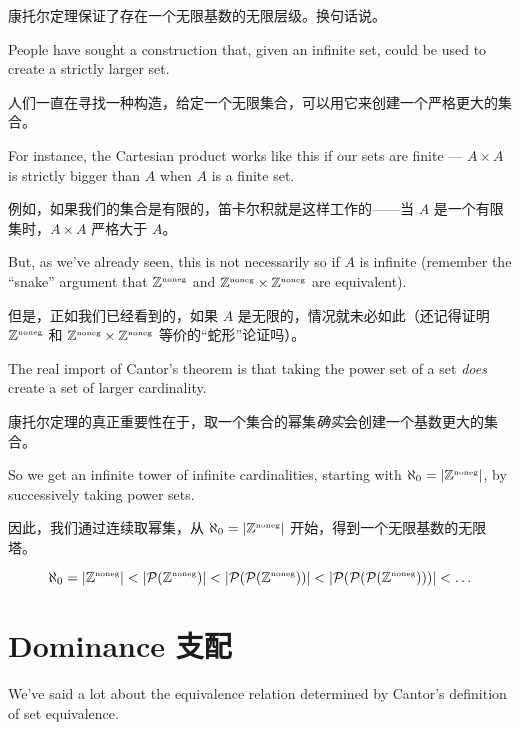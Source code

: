 康托尔定理保证了存在一个无限基数的无限层级。换句话说。

People have sought a construction
that, given an infinite set, could be used to create a strictly larger set.

人们一直在寻找一种构造，给定一个无限集合，可以用它来创建一个严格更大的集合。

For
instance, the Cartesian product works like this if our sets are finite ---
$A \times A$ is strictly bigger than $A$ when $A$ is a finite set.

例如，如果我们的集合是有限的，笛卡尔积就是这样工作的——当 $A$ 是一个有限集时，$A \times A$ 严格大于 $A$。

But, as
we've already seen,
this is not necessarily so if $A$ is infinite (remember the ``snake'' argument
that ${\mathbb Z}^{\mbox{\tiny noneg}}$ and ${\mathbb Z}^{\mbox{\tiny noneg}} \times {\mathbb Z}^{\mbox{\tiny noneg}}$ are equivalent).

但是，正如我们已经看到的，如果 $A$ 是无限的，情况就未必如此（还记得证明 ${\mathbb Z}^{\mbox{\tiny noneg}}$ 和 ${\mathbb Z}^{\mbox{\tiny noneg}} \times {\mathbb Z}^{\mbox{\tiny noneg}}$ 等价的“蛇形”论证吗）。

The
real import of Cantor's theorem is that taking the power set of a set
\emph{does} create a set of larger cardinality.

康托尔定理的真正重要性在于，取一个集合的幂集\emph{确实}会创建一个基数更大的集合。

So we get an infinite tower of infinite cardinalities, starting with
$\aleph_0 = |{\mathbb Z}^{\mbox{\tiny noneg}}|$, by successively taking power sets.

因此，我们通过连续取幂集，从 $\aleph_0 = |{\mathbb Z}^{\mbox{\tiny noneg}}|$ 开始，得到一个无限基数的无限塔。

\[ \aleph_0  = |{\mathbb Z}^{\mbox{\tiny noneg}}| < |{\mathcal P}({\mathbb Z}^{\mbox{\tiny noneg}})| < |{\mathcal P}({\mathcal P}({\mathbb Z}^{\mbox{\tiny noneg}}))| < |{\mathcal P}({\mathcal P}({\mathcal P}({\mathbb Z}^{\mbox{\tiny noneg}})))|
    < \ldots \]

\clearpage





\newpage

\section{Dominance 支配}
\label{sec:dominance}

We've said a lot about the equivalence relation
determined by Cantor's definition
of set equivalence.

